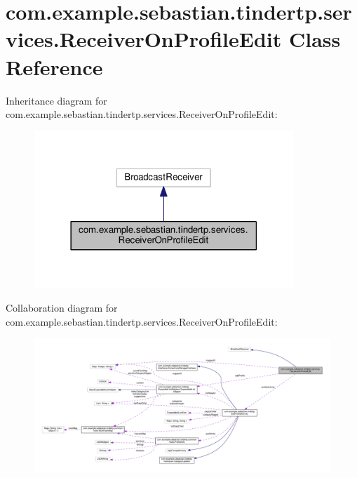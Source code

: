 \hypertarget{classcom_1_1example_1_1sebastian_1_1tindertp_1_1services_1_1ReceiverOnProfileEdit}{}\section{com.\+example.\+sebastian.\+tindertp.\+services.\+Receiver\+On\+Profile\+Edit Class Reference}
\label{classcom_1_1example_1_1sebastian_1_1tindertp_1_1services_1_1ReceiverOnProfileEdit}


Inheritance diagram for com.\+example.\+sebastian.\+tindertp.\+services.\+Receiver\+On\+Profile\+Edit\+:\nopagebreak
\begin{figure}[H]
\begin{center}
\leavevmode
\includegraphics[width=278pt]{classcom_1_1example_1_1sebastian_1_1tindertp_1_1services_1_1ReceiverOnProfileEdit__inherit__graph}
\end{center}
\end{figure}


Collaboration diagram for com.\+example.\+sebastian.\+tindertp.\+services.\+Receiver\+On\+Profile\+Edit\+:\nopagebreak
\begin{figure}[H]
\begin{center}
\leavevmode
\includegraphics[width=350pt]{classcom_1_1example_1_1sebastian_1_1tindertp_1_1services_1_1ReceiverOnProfileEdit__coll__graph}
\end{center}
\end{figure}
